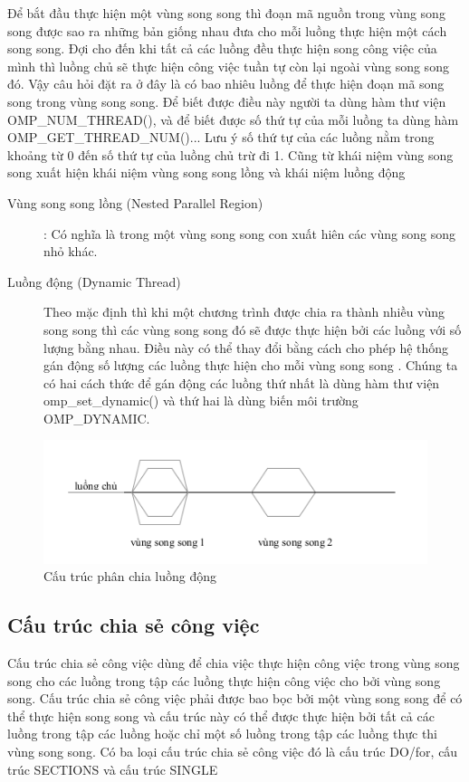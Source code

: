 \documentclass{report}
\begin{document}
Để bắt đầu thực hiện một vùng song song thì đoạn mã nguồn trong vùng song
song được sao ra những bản giống nhau đưa cho mỗi luồng thực hiện một cách song
song. Đợi cho đến khi tất cả các luồng đều thực hiện song công việc của mình thì
luồng chủ sẽ thực hiện công việc tuần tự còn lại ngoài vùng song song đó. Vậy câu hỏi
đặt ra ở đây là có bao nhiêu luồng để thực hiện đoạn mã song song trong vùng song song. 
Để biết được điều này người ta dùng hàm thư viện \textsf{OMP\_NUM\_THREAD()}, và để biết được số thứ tự của mỗi luồng ta dùng hàm \textsf{OMP\_GET\_THREAD\_NUM()}... Lưu ý số thứ tự của các luồng nằm trong khoảng từ 0 đến số thứ tự của luồng chủ trừ đi 1. Cũng từ khái niệm vùng song song xuất hiện khái niệm vùng song song lồng và khái niệm luồng động
\begin{description}
\item [Vùng song song lồng (Nested Parallel Region)]: Có nghĩa là trong một vùng
song song con xuất hiên các vùng song song nhỏ khác.
\item [Luồng động (Dynamic Thread)] Theo mặc định thì khi một chương trình được
chia ra thành nhiều vùng song song thì các vùng song song đó sẽ được thực hiện bởi
các luồng với số lượng bằng nhau. Điều này có thể thay đổi bằng cách cho phép hệ
thống gán động số lượng các luồng thực hiện cho mỗi vùng song song . Chúng ta có
hai cách thức để gán động các luồng thứ nhất là dùng hàm thư viện
\textsf{omp\_set\_dynamic()} và thứ hai là dùng biến môi trường \textsf{OMP\_DYNAMIC}.
\end{description}
\begin{figure}[htp]
	\centering
	\includegraphics[scale=0.6]{img/pic4.png}
	\caption{Cấu trúc phân chia luồng động}
	\end{figure}

\subsection{Cấu trúc chia sẻ công việc}
Cấu trúc chia sẻ công việc dùng để chia việc thực hiện công việc trong vùng
song song cho các luồng trong tập các luồng thực hiện công việc cho bởi vùng song
song. Cấu trúc chia sẻ công việc phải được bao bọc bởi một vùng song song để có thể
thực hiện song song và cấu trúc này có thể được thực hiện bởi tất cả các luồng trong
tập các luồng hoặc chỉ một số luồng trong tập các luồng thực thi vùng song song. Có
ba loại cấu trúc chia sẻ công việc đó là cấu trúc \textsf{DO/for}, cấu trúc {SECTIONS} và cấu trúc {SINGLE}
\end{document}
